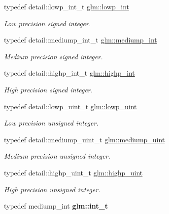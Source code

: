 \begin{DoxyCompactItemize}
\item 
typedef detail\-::lowp\-\_\-int\-\_\-t \hyperlink{group__core__precision_ga4681244bf4a184734f03aa9df4e3d288}{glm\-::lowp\-\_\-int}
\begin{DoxyCompactList}\small\item\em Low precision signed integer. \end{DoxyCompactList}\item 
typedef detail\-::mediump\-\_\-int\-\_\-t \hyperlink{group__core__precision_ga2a3dcbcd7f4e17663d393a12061ac6ac}{glm\-::mediump\-\_\-int}
\begin{DoxyCompactList}\small\item\em Medium precision signed integer. \end{DoxyCompactList}\item 
typedef detail\-::highp\-\_\-int\-\_\-t \hyperlink{group__core__precision_gaafed5240eb0a43328cb75faf5fb0a8c2}{glm\-::highp\-\_\-int}
\begin{DoxyCompactList}\small\item\em High precision signed integer. \end{DoxyCompactList}\item 
typedef detail\-::lowp\-\_\-uint\-\_\-t \hyperlink{group__core__precision_ga8077c90f2c87e419ea6c273157dcc1fc}{glm\-::lowp\-\_\-uint}
\begin{DoxyCompactList}\small\item\em Low precision unsigned integer. \end{DoxyCompactList}\item 
typedef detail\-::mediump\-\_\-uint\-\_\-t \hyperlink{group__core__precision_ga08ae38ad78ade3539fdd1d25052b8c51}{glm\-::mediump\-\_\-uint}
\begin{DoxyCompactList}\small\item\em Medium precision unsigned integer. \end{DoxyCompactList}\item 
typedef detail\-::highp\-\_\-uint\-\_\-t \hyperlink{group__core__precision_gabfd1cf11193324a5f77d3831b6ac3205}{glm\-::highp\-\_\-uint}
\begin{DoxyCompactList}\small\item\em High precision unsigned integer. \end{DoxyCompactList}\item 
\hypertarget{group__core__precision_gacd01d170508f812968875b0f2e730e8c}{typedef mediump\-\_\-int {\bfseries glm\-::int\-\_\-t}}\label{group__core__precision_gacd01d170508f812968875b0f2e730e8c}


\end{DoxyCompactItemize}
